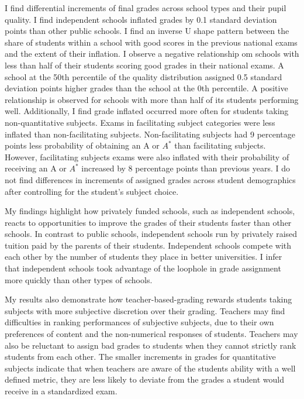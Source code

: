 I find differential increments of final grades across school types and their pupil quality. I find independent schools inflated grades by 0.1 standard deviation points than other public schools. I find an inverse U shape pattern between the share of students within a school with good scores in the previous national exams and the extent of their inflation. I observe a negative relationship om schools with less than half of their students scoring good grades in their national exams. A school at the 50th percentile of the quality distribution assigned 0.5 standard deviation points higher grades than the school at the 0th percentile. A positive relationship is observed for schools with more than half of its students performing well. Additionally, I find grade inflated occurred more often for students taking non-quantitative subjects. Exams in facilitating subject categories were less inflated than non-facilitating subjects. Non-facilitating subjects had 9 percentage points less probability of obtaining an A or $A^*$ than facilitating subjects. However, facilitating subjects exams were also  inflated with their probability of receiving an A or $A^*$ increased by 8 percentage points than previous years. I do not find differences in increments of assigned grades across student demographics after controlling for the student's subject choice.

My findings highlight how privately funded schools, such as independent schools, reacts to opportunities to improve the grades  
of their students faster than other schools. In contrast to public schools, independent schools run by privately raised tuition paid by the parents of their students. Independent schools compete with each other by the number of students they place in better universities. I infer that independent schools took advantage of the loophole in grade assignment more quickly than other types of schools. 

My results also demonstrate how teacher-based-grading rewards students taking subjects with more subjective discretion over their grading. Teachers may find difficulties in ranking performances of subjective subjects, due to their own preferences of content and the non-numerical responses of students. Teachers may also be reluctant to assign bad grades to students when they cannot strictly rank students from each other. The smaller increments in grades for quantitative subjects indicate that when teachers are aware of the students ability with a well defined metric, they are less likely to deviate from the grades a student would receive in a standardized exam. 



